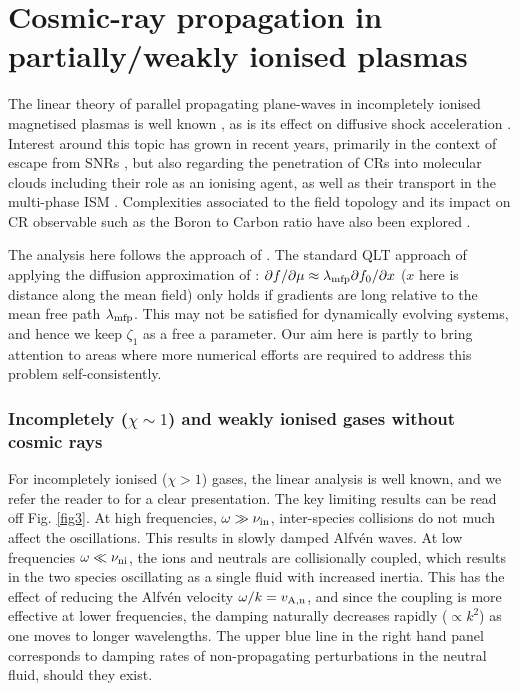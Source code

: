 \documentclass[a4paper,fleqn,usenatbib]{mnras}
\begin{document}
\section{Cosmic-ray propagation in partially/weakly ionised plasmas}
\label{sec:4}

The linear theory of parallel propagating plane-waves in incompletely ionised magnetised plasmas is well known \citep{KulsrudPearce,ZweibelShull, Tagger95,Xuetal16}, as is its effect on diffusive shock acceleration \citep{Drury96}. Interest around this topic has grown in recent years, primarily in the context of escape from SNRs \citep{Bykov13,Nava19,Inoue}, but also regarding the penetration of CRs into molecular clouds including their role as an ionising agent, as well as their transport in the multi-phase ISM \citep{Padovani,Phan,Brahimi20}. 
{
Complexities associated to the field topology and its impact on CR observable such as the Boron to Carbon ratio have also been explored \citep{DAngelo}.
}

The analysis here follows the approach of \citet{Reville07}. The standard QLT approach of applying the diffusion approximation of \cite{Skilling71}: $\partial f/\partial \mu \approx \lambda_{\rm mfp} \partial f_0/\partial x$ ($x$ here is distance along the mean field) only holds if gradients are long relative to the mean free path $\lambda_{\rm mfp}$. This may not be satisfied for dynamically evolving systems, and hence we keep $\zeta_1$ as a free a parameter. Our aim here is partly to bring attention to areas where 
more numerical efforts are required to address this problem self-consistently.



\subsubsection*{Incompletely ($\chi \sim 1$) and weakly ionised gases without cosmic rays  }

For incompletely ionised ($\chi > 1$) gases, the linear analysis is well known, and we refer the reader to  \cite{ZweibelShull} for a clear presentation. The key limiting results can be read off Fig. \ref{fig3}. At high frequencies, $\omega \gg \nu_{\rm in}$, inter-species collisions do not much affect the oscillations. This results in slowly damped  Alfv\'en waves. At low frequencies $\omega \ll \nu_{\rm ni}$, the ions and neutrals are collisionally coupled, {which results in the two species oscillating as a single fluid with increased inertia. This has the effect of reducing the Alfv\'en  velocity $\omega/k= v_{\rm A,n}$, and since the coupling is more effective at lower frequencies, the damping naturally decreases rapidly ($\propto k^2$) as one moves to longer wavelengths.} The upper blue line in the right hand panel corresponds to damping rates of non-propagating perturbations in the neutral fluid, should they exist. 
\end{document}
